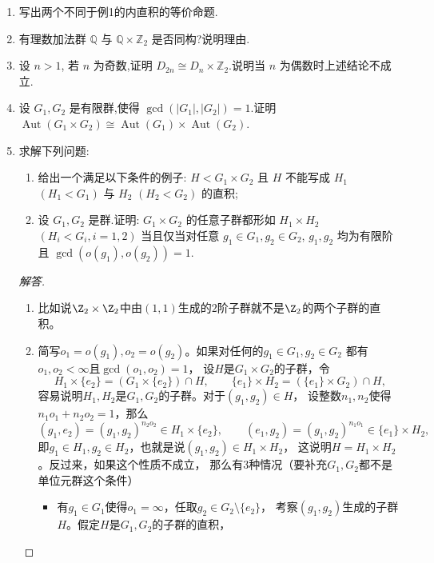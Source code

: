 \begin{enumerate}
\item 写出两个不同于例1的内直积的等价命题.
\item 有理数加法群 $\mathbb{Q}$ 与 $\mathbb{Q} \times \mathbb{Z}_2$ 是否同构?说明理由.

\item 设 $n>1$, 若 $n$ 为奇数,证明 $D_{2n} \cong D_{n} \times \mathbb{Z}_2$.说明当 $n$ 为偶数时上述结论不成立.

\item 设 $G_1 , G_2$ 是有限群,使得 $\gcd(|G_{1}|, |G_{2}|) = 1$.证明 $\operatorname{Aut}(G_1 \times G_2) \cong  \operatorname{Aut}(G_1) \times  \operatorname{Aut}(G_2)$.

\item 求解下列问题:
\begin{enumerate}[label=(\arabic*)]
\item 给出一个满足以下条件的例子: $H < G_{1} \times G_{2}$ 且 $H$ 不能写成 $H_{1}$ $(H_{1} < G_{1})$ 与 $H_{2}$ $(H_{2} < G_{2})$ 的直积;
\item 设 $G_{1}, G_{2}$ 是群.证明: $G_{1} \times G_{2}$ 的任意子群都形如 $H_{1} \times H_{2}$ $(H_i < G_i , i = 1,2)$ 
当且仅当对任意 $g_{1} \in G_{1}, g_{2} \in G_{2}$, $g_{1}, g_{2}$ 均为有限阶且 $\gcd(o(g_1), o(g_2)) = 1$. 
\end{enumerate}
\begin{proof}[解答]
    \begin{enumerate}[label=(\arabic*)]
    \item 比如说$\Z_2\times\Z_2$中由$(1,1)$生成的$2$阶子群就不是$\Z_2$的两个子群的直积。
    \item 简写$o_1=o(g_1),o_2=o(g_2)$。如果对任何的$g_1 \in G_1,g_2 \in G_2$
    都有$o_1,o_2<\infty$且$\operatorname{gcd}(o_1,o_2)=1$，
    设$H$是$G_1 \times G_2$的子群，令
    \[H_1 \times \{e_2\}=(G_1 \times \{e_2\}) \cap H,
    \qquad\{e_1\} \times H_2=(\{e_1\} \times G_2) \cap H,\]
    容易说明$H_1,H_2$是$G_1,G_2$的子群。对于$(g_1,g_2) \in H$，
    设整数$n_1,n_2$使得$n_1o_1+n_2o_2=1$，那么
    \[(g_1,e_2)=(g_1,g_2)^{n_2o_2} \in H_1 \times \{e_2\},
    \qquad(e_1,g_2)=(g_1,g_2)^{n_1o_1} \in \{e_1\} \times H_2,\]
    即$g_1 \in H_1,g_2 \in H_2$，也就是说$(g_1,g_2) \in H_1 \times H_2$，
    这说明$H=H_1 \times H_2$。反过来，如果这个性质不成立，
    那么有$3$种情况（要补充$G_1,G_2$都不是单位元群这个条件）
    \begin{itemize}
    \item 有$g_1 \in G_1$使得$o_1=\infty$，任取$g_2 \in G_2\setminus\{e_2\}$，
    考察$(g_1,g_2)$生成的子群$H$。假定$H$是$G_1,G_2$的子群的直积，

\end{itemize}
\end{enumerate}
\end{proof}
\end{enumerate}
